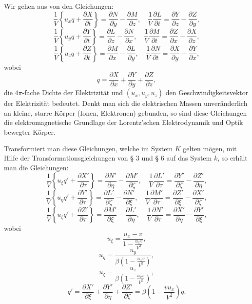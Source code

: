 \documentclass[17pt]{webarticle}       %
\begin{document}
Wir gehen aus von den Gleichungen:
\[
\frac{1}{V} \left\{ u_x q + \frac{\partial X}{\partial t} \right\} = \frac{\partial N}{\partial y} - \frac{\partial M}{\partial z}, \quad \frac{1}{V} \frac{\partial L}{\partial t} = \frac{\partial Y}{\partial z} - \frac{\partial Z}{\partial y},
\]
\[
\frac{1}{V} \left\{ u_y q + \frac{\partial Y}{\partial t} \right\} = \frac{\partial L}{\partial z} - \frac{\partial N}{\partial x}, \quad \frac{1}{V} \frac{\partial M}{\partial t} = \frac{\partial Z}{\partial x} - \frac{\partial X}{\partial z},
\]
\[
\frac{1}{V} \left\{ u_z q + \frac{\partial Z}{\partial t} \right\} = \frac{\partial M}{\partial x} - \frac{\partial L}{\partial y}, \quad \frac{1}{V} \frac{\partial N}{\partial t} = \frac{\partial X}{\partial y} - \frac{\partial Y}{\partial x},
\]
wobei
\[
q = \frac{\partial X}{\partial x} + \frac{\partial Y}{\partial y} + \frac{\partial Z}{\partial z},
\]
die \( 4 \pi \)-fache Dichte der Elektrizität und \( (u_x, u_y, u_z) \) den Geschwindigkeitsvektor der Elektrizität bedeutet. Denkt man sich die elektrischen Massen unveränderlich an kleine, starre Körper (Ionen, Elektronen) gebunden, so sind diese Gleichungen die elektromagnetische Grundlage der Lorentz'schen Elektrodynamik und Optik bewegter Körper.

Transformiert man diese Gleichungen, welche im System \( K \) gelten mögen, mit Hilfe der Transformationsgleichungen von § 3 und § 6 auf das System \( k \), so erhält man die Gleichungen:
\[
\frac{1}{V} \left\{ u_\xi q' + \frac{\partial X'}{\partial \tau} \right\} = \frac{\partial N'}{\partial \eta} - \frac{\partial M'}{\partial \zeta}, \quad \frac{1}{V} \frac{\partial L'}{\partial \tau} = \frac{\partial Y'}{\partial \zeta} - \frac{\partial Z'}{\partial \eta},
\]
\[
\frac{1}{V} \left\{ u_\eta q' + \frac{\partial Y'}{\partial \tau} \right\} = \frac{\partial L'}{\partial \zeta} - \frac{\partial N'}{\partial \xi}, \quad \frac{1}{V} \frac{\partial M'}{\partial \tau} = \frac{\partial Z'}{\partial \xi} - \frac{\partial X'}{\partial \zeta},
\]
\[
\frac{1}{V} \left\{ u_\zeta q' + \frac{\partial Z'}{\partial \tau} \right\} = \frac{\partial M'}{\partial \xi} - \frac{\partial L'}{\partial \eta}, \quad \frac{1}{V} \frac{\partial N'}{\partial \tau} = \frac{\partial X'}{\partial \eta} - \frac{\partial Y'}{\partial \xi},
\]
wobei
\[
u_\xi = \frac{u_x - v}{1 - \frac{u_x v}{V^2}},
\]
\[
u_\eta = \frac{u_y}{\beta \left( 1 - \frac{u_x v}{V^2} \right)},
\]
\[
u_\zeta = \frac{u_z}{\beta \left( 1 - \frac{u_x v}{V^2} \right)},
\]
\[
q' = \frac{\partial X'}{\partial \xi} + \frac{\partial Y'}{\partial \eta} + \frac{\partial Z'}{\partial \zeta} = \beta \left( 1 - \frac{v u_x}{V^2} \right) q.
\]
\end{document}

